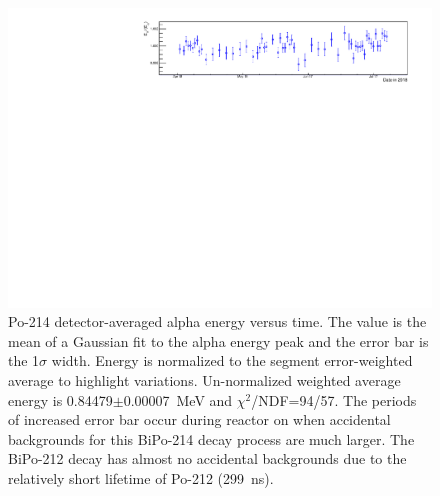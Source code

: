 \FloatBarrier
\newpage
\begin{figure}[!h]
\centering
\includegraphics[width=1.05\textwidth]{figures/PubBiPo214EvsT.pdf}
\caption{\label{fig:EvsT214}Po-214 detector-averaged alpha energy versus time. The value is the mean of a Gaussian fit to the alpha energy peak and the error bar is the 1$\sigma$ width. Energy is normalized to the segment error-weighted average to highlight variations. Un-normalized weighted average energy is 0.84479$\pm$0.00007~MeV and $\chi^2$/NDF=94/57. The periods of increased error bar occur during reactor on when accidental backgrounds for this BiPo-214 decay process are much larger. The BiPo-212 decay has almost no accidental backgrounds due to the relatively short lifetime of Po-212 (299~ns).}
\end{figure}
